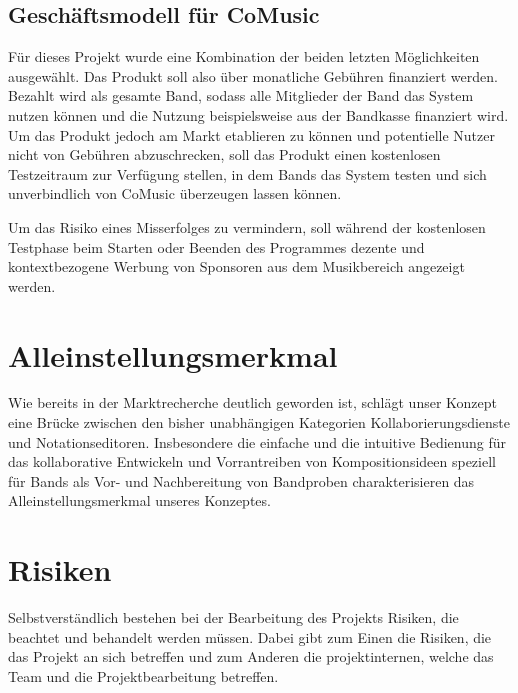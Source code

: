 \documentclass[12pt]{scrartcl}
\begin{document}
\subsection{Geschäftsmodell für CoMusic}

Für dieses Projekt wurde eine Kombination der beiden letzten Möglichkeiten ausgewählt. Das Produkt soll also über monatliche Gebühren finanziert werden. Bezahlt wird als gesamte Band, sodass alle Mitglieder der Band das System nutzen können und die Nutzung beispielsweise aus der Bandkasse finanziert wird. Um das Produkt jedoch am Markt etablieren zu können und potentielle Nutzer nicht von Gebühren abzuschrecken, soll das Produkt einen kostenlosen Testzeitraum zur Verfügung stellen, in dem Bands das System testen und sich unverbindlich von CoMusic überzeugen lassen können.

Um das Risiko eines Misserfolges zu vermindern, soll während der kostenlosen Testphase beim Starten oder Beenden des Programmes dezente und kontextbezogene Werbung von Sponsoren aus dem Musikbereich angezeigt werden.



\section{Alleinstellungsmerkmal}

Wie bereits in der Marktrecherche deutlich geworden ist, schlägt unser Konzept eine Brücke zwischen den bisher unabhängigen Kategorien Kollaborierungsdienste und Notationseditoren. Insbesondere die einfache und die intuitive Bedienung für das kollaborative Entwickeln und Vorrantreiben von Kompositionsideen speziell für Bands als Vor- und Nachbereitung von Bandproben charakterisieren das Alleinstellungsmerkmal unseres Konzeptes.


\section{Risiken}



Selbstverständlich bestehen bei der Bearbeitung des Projekts Risiken, die beachtet und behandelt werden müssen. Dabei gibt zum Einen die Risiken, die das Projekt an sich betreffen und zum Anderen die projektinternen, welche das Team und die Projektbearbeitung betreffen.
\end{document}

